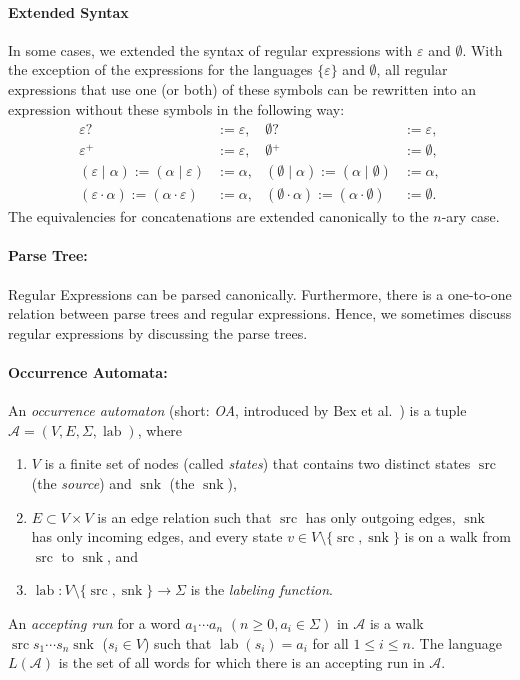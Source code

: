 \documentclass[a4paper,11pt, svgnames,titlepage]{article}
\newcommand{\rxp}{{^\mathtt{+}}}
\newcommand{\rxo}{\mathtt{?}}
\newcommand{\rxc}{\cdot}
\DeclareMathOperator{\ror}{\mathtt{|}}
\newcommand{\emptyword}{\varepsilon}
\newcommand{\df}{:=}
\DeclareMathOperator{\lab}{lab}
\DeclareMathOperator{\src}{src}
\DeclareMathOperator{\snk}{snk}
\begin{document}
\paragraph{Extended Syntax} In some cases, we extended the syntax of regular expressions with $\emptyword$ and $\emptyset$. With the exception of the expressions for the languages $\{\emptyword\}$ and $\emptyset$, all regular expressions that use one (or both) of these symbols can be rewritten into an expression without these symbols in the following way:
\begin{align*}
	\emptyword \rxo &\df \emptyword, & \emptyset \rxo &\df \emptyword,\\
	\emptyword \rxp &\df \emptyword, & \emptyset \rxp &\df \emptyset,\\
	(\emptyword \ror \alpha)\df(\alpha \ror \emptyword)&\df \alpha, & (\emptyset \ror \alpha)\df(\alpha \ror \emptyset) &\df \alpha,\\
	(\emptyword \rxc \alpha)\df(\alpha \rxc \emptyword)&\df \alpha, & (\emptyset \rxc \alpha)\df(\alpha \rxc \emptyset) &\df \emptyset.
\end{align*}
The equivalencies for concatenations are extended canonically to the $n$-ary case.

\paragraph{Parse Tree:} Regular Expressions can be parsed canonically. Furthermore, there is a one-to-one relation between parse trees and regular expressions. Hence, we sometimes discuss regular expressions by discussing the parse trees.

\paragraph{Occurrence Automata:} An \emph{occurrence automaton} (short: \emph{OA}, introduced by Bex et al.~\cite{bex:kore}) is a tuple $\mathcal{A}=(V,E,\Sigma,\lab)$, where 
\begin{enumerate}
	\item $V$ is a finite set of nodes (called \emph{states}) that contains two distinct states $\src$ (the \emph{source}) and $\snk$ (the $\snk$),
	\item $E\subset V\times V$ is an edge relation such that $\src$ has only outgoing edges, $\snk$ has only incoming edges, and every state $v\in V\setminus\{\src,\snk\}$ is on a walk from $\src$ to $\snk$, and
	\item $\lab: V\setminus\{\src,\snk\} \to \Sigma $ is the \emph{labeling function}. 
\end{enumerate}
An \emph{accepting run} for a word $a_1 \cdots a_n$ $(n\geq 0, a_i\in\Sigma)$ in $\mathcal{A}$ is a walk $\src s_1 \cdots s_n \snk$ ($s_i\in V$) such that $\lab(s_i)=a_i$ for all $1\leq i \leq n$. The language $L(\mathcal{A})$ is the set of all words for which there is an accepting run in $\mathcal{A}$.
\end{document}
